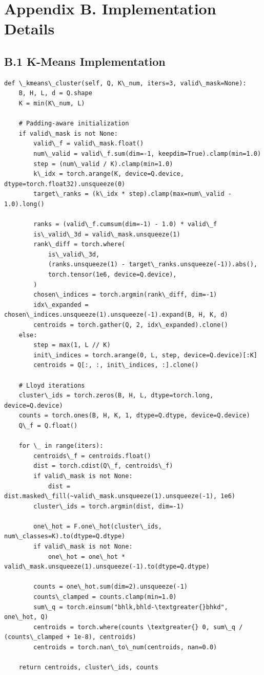 \section{Appendix B. Implementation Details}

\subsection{B.1 K-Means Implementation}

\begin{lstlisting}
def \_kmeans\_cluster(self, Q, K\_num, iters=3, valid\_mask=None):
    B, H, L, d = Q.shape
    K = min(K\_num, L)
    
    # Padding-aware initialization
    if valid\_mask is not None:
        valid\_f = valid\_mask.float()
        num\_valid = valid\_f.sum(dim=-1, keepdim=True).clamp(min=1.0)
        step = (num\_valid / K).clamp(min=1.0)
        k\_idx = torch.arange(K, device=Q.device, dtype=torch.float32).unsqueeze(0)
        target\_ranks = (k\_idx * step).clamp(max=num\_valid - 1.0).long()
        
        ranks = (valid\_f.cumsum(dim=-1) - 1.0) * valid\_f
        is\_valid\_3d = valid\_mask.unsqueeze(1)
        rank\_diff = torch.where(
            is\_valid\_3d,
            (ranks.unsqueeze(1) - target\_ranks.unsqueeze(-1)).abs(),
            torch.tensor(1e6, device=Q.device),
        )
        chosen\_indices = torch.argmin(rank\_diff, dim=-1)
        idx\_expanded = chosen\_indices.unsqueeze(1).unsqueeze(-1).expand(B, H, K, d)
        centroids = torch.gather(Q, 2, idx\_expanded).clone()
    else:
        step = max(1, L // K)
        init\_indices = torch.arange(0, L, step, device=Q.device)[:K]
        centroids = Q[:, :, init\_indices, :].clone()
    
    # Lloyd iterations
    cluster\_ids = torch.zeros(B, H, L, dtype=torch.long, device=Q.device)
    counts = torch.ones(B, H, K, 1, dtype=Q.dtype, device=Q.device)
    Q\_f = Q.float()
    
    for \_ in range(iters):
        centroids\_f = centroids.float()
        dist = torch.cdist(Q\_f, centroids\_f)
        if valid\_mask is not None:
            dist = dist.masked\_fill(~valid\_mask.unsqueeze(1).unsqueeze(-1), 1e6)
        cluster\_ids = torch.argmin(dist, dim=-1)
        
        one\_hot = F.one\_hot(cluster\_ids, num\_classes=K).to(dtype=Q.dtype)
        if valid\_mask is not None:
            one\_hot = one\_hot * valid\_mask.unsqueeze(1).unsqueeze(-1).to(dtype=Q.dtype)
        
        counts = one\_hot.sum(dim=2).unsqueeze(-1)
        counts\_clamped = counts.clamp(min=1.0)
        sum\_q = torch.einsum("bhlk,bhld-\textgreater{}bhkd", one\_hot, Q)
        centroids = torch.where(counts \textgreater{} 0, sum\_q / (counts\_clamped + 1e-8), centroids)
        centroids = torch.nan\_to\_num(centroids, nan=0.0)
    
    return centroids, cluster\_ids, counts
\end{lstlisting}

